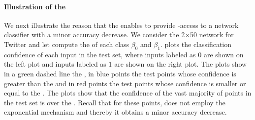 \paragraph{Illustration of the \propa}
We next illustrate the reason that the \propa enables \tool to provide \propi-access to a network classifier with a minor accuracy decrease.
We consider the 2$\times$50 network for Twitter and let \tool compute the \propa of each class $\beta_0$ and $\beta_1$.
  plots the classification confidence of each input in the test set, where inputs labeled as $0$ are shown on the left  plot and inputs labeled as $1$ are shown on the right plot. The plots show in a green dashed line the \propa, in blue points the test points whose confidence is greater than the \propa and in red points the test points whose confidence is smaller or equal to the \propa. The plots 
 show that the confidence of the vast majority of points in the test set is over the \propa. Recall that for these points, \tool does not employ the exponential mechanism and thereby it obtains a minor accuracy decrease.


